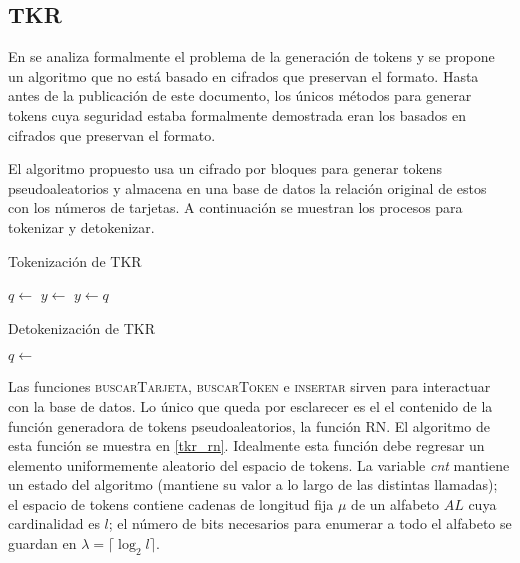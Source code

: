 %
%

\subsection{TKR}

En \cite{doc_sandra} se analiza formalmente el problema de la generación de
tokens y se propone un algoritmo que no está basado en cifrados que preservan el
formato. Hasta antes de la publicación de este documento, los únicos métodos
para generar tokens cuya seguridad estaba formalmente demostrada eran los
basados en cifrados que preservan el formato.

El algoritmo propuesto usa un cifrado por bloques para generar tokens
pseudoaleatorios y almacena en una base de datos la relación original de estos
con los números de tarjetas. A continuación se muestran los procesos para
tokenizar y detokenizar.

\begin{algorithm}
  \caption{\label{tkr_tokenizacion} Tokenización de TKR}
  \begin{algorithmic}[1]
      \State $ q \gets $ 
        \State $ y \gets $ 
        \State {}
      \Else
        \State $ y \gets q $
      \EndIf
      \State {}
    \EndFunction
  \end{algorithmic}
\end{algorithm}

\begin{algorithm}
  \caption{\label{tkr_detokenizacion} Detokenización de TKR}
  \begin{algorithmic}[1]
      \State $ q \gets $ 
        \State {}
      \Else
        \State {}
      \EndIf
    \EndFunction
  \end{algorithmic}
\end{algorithm}

Las funciones \textsc{buscarTarjeta}, \textsc{buscarToken} e \textsc{insertar}
sirven para interactuar con la base de datos. Lo único que queda por esclarecer
es el el contenido de la función generadora de tokens pseudoaleatorios, la
función \textsc{RN}. El algoritmo de esta función se muestra en \ref{tkr_rn}.
Idealmente esta función debe regresar un elemento uniformemente
aleatorio del espacio de tokens. La variable \textit{cnt} mantiene un
estado del algoritmo (mantiene su valor a lo largo de las distintas llamadas);
el espacio de tokens contiene cadenas de longitud fija $ \mu $ de un alfabeto
$ AL $ cuya cardinalidad es $ l $; el número de bits necesarios para enumerar a
todo el alfabeto se guardan en $ \lambda = \lceil \log_2 l \rceil$.

